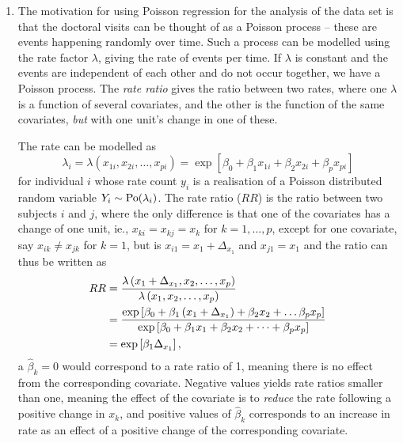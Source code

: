 \documentclass[a4paper,11pt]{article}
\begin{document}
\begin{enumerate}[label=2\alph*)]
    \item The motivation for using Poisson regression for the analysis of the data set is that the doctoral visits can be thought of as a Poisson process -- these are events happening randomly over time. Such a process can be modelled using the rate factor $\lambda$, giving the rate of events per time. If $\lambda$ is constant and the events are independent of each other and do not occur together, we have a Poisson process. The \textit{rate ratio} gives the ratio between two rates, where one $\lambda$ is a function of several covariates, and the other is the function of the same covariates, \textit{but} with one unit's change in one of these.
        
        The rate can be modelled as
        \begin{equation}
            \lambda_i = \lambda\left( x_{1i}, x_{2i}, \dots, x_{pi} \right) = \exp\left[ \beta_0 + \beta_{1} x_{1i} + \beta_2 x_{2i} + \beta_p x_{pi} \right]
            \label{eq:rate}
        \end{equation}
        for individual $i$ whose rate count $y_i$ is a realisation of a Poisson distributed random variable $Y_i \sim {\rm Po}(\lambda_i)$. The rate ratio ($RR$) is the ratio between two subjects $i$ and $j$, where the only difference is that one of the covariates has a change of one unit, ie., $x_{ki} = x_{kj} = x_k$ for $k=1,\dots,p$, except for one covariate, say $x_{ik} \neq x_{jk}$ for $k=1$, but is $x_{i1} = x_1 + \Delta_{x_1}$ and $x_{j1} = x_1$ and the ratio can thus be written as
        \begin{align}
            RR &= \frac{\lambda \left( x_1 + \Delta_{x_1}, x_2, \dots, x_p \right)}{\lambda \left( x_1, x_2, \dots, x_p \right)} \notag \\
               &= \frac{\exp\left[ \beta_0 + \beta_1 \left( x_1 + \Delta_{x_1} \right) + \beta_2 x_2 + \dots \beta_p x_p \right]}{\exp \left[ \beta_0 + \beta_1 x_1 + \beta_2 x_2 + \dots + \beta_p x_p \right]} \notag \\
               &= \exp\left[ \beta_1 \Delta_{x_1} \right],
            \label{eq:rate_ratio}
        \end{align}
        a $\hat{\beta}_k = 0$ would correspond to a rate ratio of 1, meaning there is no effect from the corresponding covariate. Negative values yields rate ratios smaller than one, meaning the effect of the covariate is to \textit{reduce} the rate following a positive change in $x_k$, and positive values of $\hat{\beta}_k$ corresponds to an increase in rate as an effect of a positive change of the corresponding covariate.


\end{enumerate}
\end{document}

